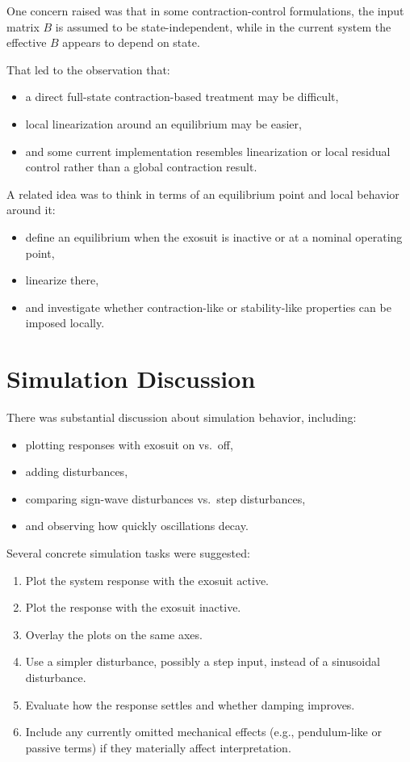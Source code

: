 \documentclass[11pt]{article}
\begin{document}
One concern raised was that in some contraction-control formulations, the input matrix \(B\) is assumed to be state-independent, while in the current system the effective \(B\) appears to depend on state.

That led to the observation that:
\begin{itemize}[leftmargin=1.5em]
    \item a direct full-state contraction-based treatment may be difficult,
    \item local linearization around an equilibrium may be easier,
    \item and some current implementation resembles linearization or local residual control rather than a global contraction result.
\end{itemize}

A related idea was to think in terms of an equilibrium point and local behavior around it:
\begin{itemize}[leftmargin=1.5em]
    \item define an equilibrium when the exosuit is inactive or at a nominal operating point,
    \item linearize there,
    \item and investigate whether contraction-like or stability-like properties can be imposed locally.
\end{itemize}

\section{Simulation Discussion}
There was substantial discussion about simulation behavior, including:
\begin{itemize}[leftmargin=1.5em]
    \item plotting responses with exosuit on vs.\ off,
    \item adding disturbances,
    \item comparing sign-wave disturbances vs.\ step disturbances,
    \item and observing how quickly oscillations decay.
\end{itemize}

Several concrete simulation tasks were suggested:
\begin{enumerate}[leftmargin=1.5em]
    \item Plot the system response with the exosuit active.
    \item Plot the response with the exosuit inactive.
    \item Overlay the plots on the same axes.
    \item Use a simpler disturbance, possibly a step input, instead of a sinusoidal disturbance.
    \item Evaluate how the response settles and whether damping improves.
    \item Include any currently omitted mechanical effects (e.g., pendulum-like or passive terms) if they materially affect interpretation.
\end{enumerate}
\end{document}
